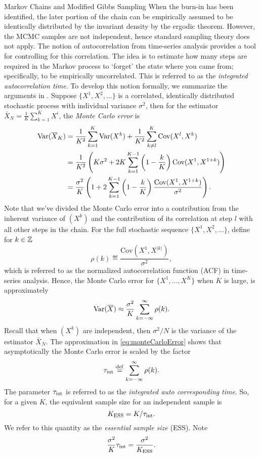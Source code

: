 \begin{chapter}{Markov Chains and Modified Gibbs Sampling}
When the burn-in has been identified, the later portion of the chain can be empirically assumed to be identically distributed by the invariant density by the ergodic theorem. 
However, the MCMC samples are not independent, hence standard sampling theory does not apply.
The notion of autocorrelation from time-series analysis provides a tool for controlling for this correlation.
The idea is to estimate how many steps are required in the Markov process to `forget' the state where you came from; specifically, to be empirically uncorrelated.
This is referred to as the \emph{integrated autocorrelation time}.
To develop this notion formally, we summarize the arguments in \citep{sokal1997monte}. 
Suppose $\{X^1,X^2,\dots\}$ is a correlated, identically distributed stochastic process with individual variance $\sigma^2$, then for the estimator $\bar X_N=\frac1K\sum_{k=1}^KX^i$, the {\em Monte Carlo error} is  
\begin{align}
{\rm Var}(\bar X_K)
  &=\frac{1}{K^2}\sum_{k=1}^K{\rm Var}(X^k)+\frac{1}{K^2}\sum_{k\neq l}^K {\rm Cov}(X^l,X^k)\nonumber\\
  &=\frac{1}{K^2}\left(K\sigma^2+2K\sum_{k=1}^{K-1}\left(1-\frac{k}{K}\right){\rm Cov}(X^1,X^{1+k})\right)\nonumber\\
  &=\frac{\sigma^2}{K}\left(1+2\sum_{k=1}^{K-1}\left(1-\frac{k}{K}\right)\frac{{\rm Cov}(X^1,X^{1+k})}{\sigma^2}\right).
\end{align}
Note that we've divided the Monte Carlo error into a contribution from the inherent variance of $(X^k)$ and the contribution of its correlation at step $l$ with all other steps in the chain.
For the full stochastic sequence $\{X^1,X^2,\dots\}$, define for $k \in \Z$
\begin{equation}
  \rho(k) \eqdef \frac{\mathrm{Cov}(X^1, X^{|k|})}{\sigma^2},
\end{equation}
which is referred to as the normalized autocorrelation function (ACF) in time-series analysis.
Hence, the Monte Carlo error for $\{X^1,\dots,X^K\}$ when $K$ is large, is approximately 
\begin{equation} \label{eq:monteCarloError}
{\rm Var}(\bar X) \approx \frac{\sigma^2}{K}\sum_{k=-\infty}^\infty \rho(k).
\end{equation}
Recall that when $(X^k)$ are independent, then $\sigma^2/N$ is the variance of the estimator $\bar X_N$.
The approximation in \eqref{eq:monteCarloError} shows that asymptotically the Monte Carlo error is scaled by the factor
\begin{equation}
  \tau_{\rm int}\eqdef \sum_{k=-\infty}^\infty \rho(k).
\end{equation}
The parameter $\tau_{\rm int}$ is referred to as the \emph{integrated auto corresponding time}.
So, for a given $K$, the equivalent sample size for an independent sample is
\begin{equation}
  K_{\rm ESS} = K/\tau_{\rm int}.
\end{equation}
We refer to this quantity as the \emph{essential sample size} (ESS).
Note 
\begin{equation}
  \frac{\sigma^2}{K} \tau_{\rm int} = \frac{\sigma^2}{K_{\rm ESS}}.
\end{equation}


\end{chapter}
